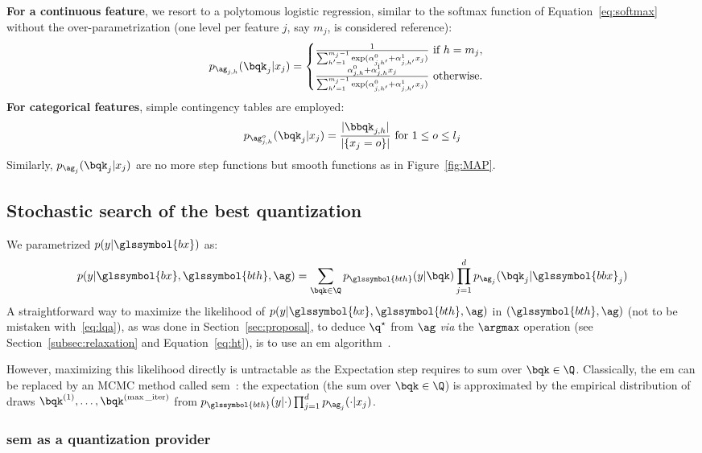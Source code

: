 {\bf For a continuous feature}, we resort to a polytomous logistic regression, similar to the softmax function of Equation~\eqref{eq:softmax} without the over-parametrization (one level per feature $j$, say $m_j$, is considered reference):
\[ p_{\ag_{j,h}}(\bqk_j | x_j) = \begin{cases} \frac{1}{\sum_{h'=1}^{m_j-1} \exp(\alpha_{j,h'}^0 + \alpha_{j,h'}^1 x_j)} \text{ if } h = m_j, \\ \frac{\alpha_{j,h}^0 + \alpha_{j,h}^1 x_j}{\sum_{h'=1}^{m_j-1} \exp(\alpha_{j,h'}^0 + \alpha_{j,h'}^1 x_j)} \text{ otherwise.} \end{cases} \]
{\bf For categorical features}, simple contingency tables are employed:
\[ p_{\ag_{j,h}^o}(\bqk_j | x_j) = \frac{|\bbqk_{j,h}|}{|\{x_j=o\}|} \text{ for } 1 \leq o \leq l_j \]
Similarly, $p_{\ag_j}(\bqk_j | x_j)$ are no more step functions but smooth functions as in Figure~\ref{fig:MAP}.

\subsection{Stochastic search of the best quantization} \label{subsec:stoch}

We parametrized $p(y|\glssymbol{bx})$ as:
\begin{equation}
p(y | \glssymbol{bx}, \glssymbol{bth}, \ag) = \sum_{\bqk \in \Q} p_{\glssymbol{bth}}(y | \bqk) \prod_{j=1}^d p_{\ag_j}(\bqk_j | \glssymbol{bbx}_j)
\end{equation}
A straightforward way to maximize the likelihood of $p(y | \glssymbol{bx}, \glssymbol{bth}, \ag)$ in $(\glssymbol{bth}, \ag)$ (not to be mistaken with~\eqref{eq:lqa}), as was done in Section~\ref{sec:proposal}, to deduce $\q^\star$ from $\ag$ \textit{via} the $\argmax$ operation (see Section~\ref{subsec:relaxation} and Equation~\eqref{eq:ht}), is to use an \gls{em} algorithm~\cite{dempster1977maximum}.

However, maximizing this likelihood directly is untractable as the Expectation step requires to sum over $\bqk \in \Q$. Classically, the \gls{em} can be replaced by an MCMC method called \acrlong{sem}~\cite{celeux1985sem}: the expectation (the sum over $\bqk \in \Q$) is approximated by the empirical distribution of draws $\bqk^{(1)}, \dots, \bqk^{(\max\_{\text{iter}})}$ from $p_{\glssymbol{bth}}(y | \cdot) \prod_{j=1}^d p_{\ag_j}(\cdot | x_j)$.

\subsubsection{\gls{sem} as a quantization provider}

